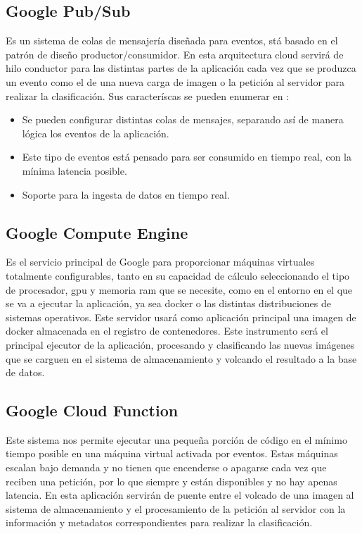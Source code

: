 \subsection{Google Pub/Sub}\label{subsec:pubsub}
Es un sistema de colas de mensajería diseñada para eventos,
stá basado en el patrón de diseño productor/consumidor.
En esta arquitectura cloud servirá de hilo conductor para las distintas partes de la aplicación cada vez que se produzca un evento como el de una nueva carga de imagen o la petición al servidor para realizar la clasificación.
Sus caracteríscas se pueden enumerar en :

\begin{itemize}
    \item Se pueden configurar distintas colas de mensajes, separando así de manera lógica los eventos de la aplicación.
    \item Este tipo de eventos está pensado para ser consumido en tiempo real, con la mínima latencia posible.
    \item Soporte para la ingesta de datos en tiempo real.
\end{itemize}

\subsection{Google Compute Engine}\label{subsec:computeengine}
Es el servicio principal de Google para proporcionar máquinas virtuales totalmente configurables, tanto en su capacidad de cálculo seleccionando el tipo de procesador, gpu y memoria ram que se necesite, como en el entorno
en el que se va a ejecutar la aplicación, ya sea docker o las distintas distribuciones de sistemas operativos.
Este servidor usará como aplicación principal una imagen de docker almacenada en el registro de contenedores.
Este instrumento será el principal ejecutor de la aplicación, procesando y clasificando las nuevas imágenes que se carguen en el sistema de almacenamiento y volcando el resultado a la base de datos.

\subsection{Google Cloud Function}\label{subsec:cloudfunction}
Este sistema nos permite ejecutar una pequeña porción de código en el mínimo tiempo posible en una máquina virtual activada por eventos.
Estas máquinas escalan bajo demanda y no tienen que encenderse o apagarse cada vez que reciben una petición, por lo que siempre y están disponibles y no hay apenas latencia.
En esta aplicación servirán de puente entre el volcado de una imagen al sistema de almacenamiento y el procesamiento de la petición al servidor con la información y metadatos correspondientes para realizar
la clasificación.

